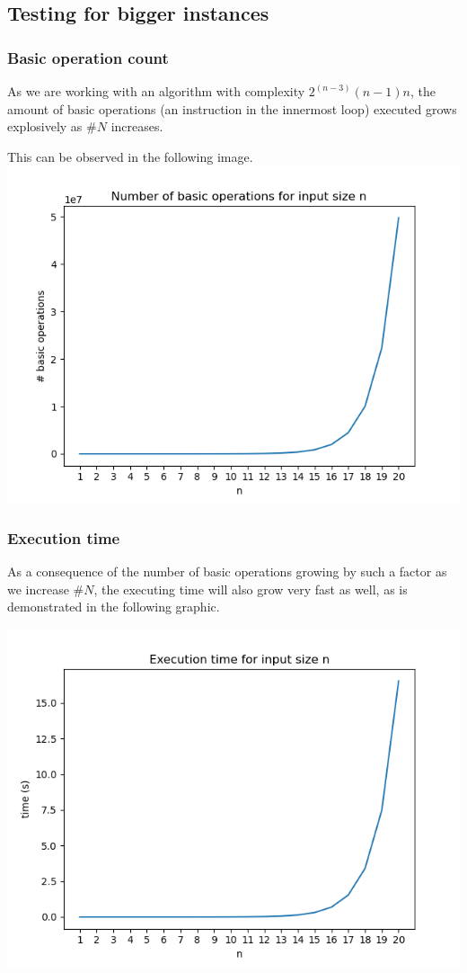 \documentclass[...]{revdetua}
\begin{document}
\subsection{Testing for bigger instances}
\subsubsection{Basic operation count}
As we are working with an algorithm with complexity $2^{(n-3)}(n-1)n$, the amount of basic operations (an instruction in the innermost loop) executed grows explosively as $\#N$ increases.\par This can be observed in the following image.
\includegraphics[scale=0.5]{basic_ops.png}
\subsubsection{Execution time}
As a consequence of the number of basic operations growing by such a factor as we increase $\#N$, the executing time will also grow very fast as well, as is demonstrated in the following graphic.

\includegraphics[scale=0.5]{exe_time.png}
\end{document}
